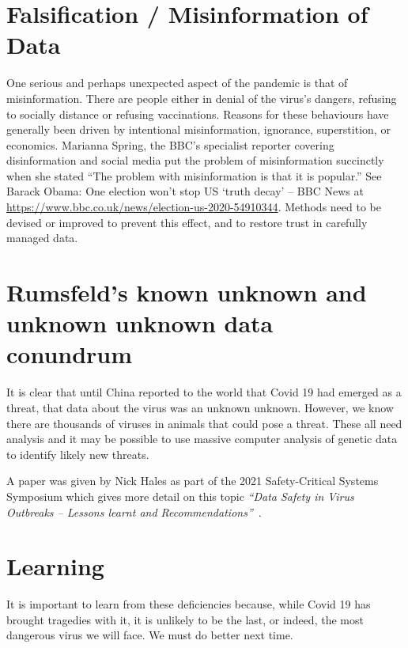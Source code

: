 \section{Falsification / Misinformation of Data}
One serious and perhaps unexpected aspect of the pandemic is that of misinformation. There are people either in denial of the virus’s dangers, refusing to socially distance or refusing vaccinations. Reasons for these behaviours have generally been driven by intentional misinformation, ignorance, superstition, or economics. Marianna Spring, the BBC’s specialist reporter covering disinformation and social media put the problem of misinformation succinctly when she stated “The problem with misinformation is that it is popular.” See Barack Obama: One election won't stop US `truth decay' -- BBC News at \href{https://www.bbc.co.uk/news/election-us-2020-54910344}{https://www.bbc.co.uk/news/election-us-2020-54910344}. Methods need to be devised or improved to prevent this effect, and to restore trust in carefully managed data. 

\section{Rumsfeld’s known unknown and unknown unknown data conundrum}

It is clear that until China reported to the world that Covid 19 had emerged as a threat, that data about the virus was an unknown unknown. However, we know there are thousands of viruses in animals that could pose a threat. These all need analysis and it may be possible to use massive computer analysis of genetic data to identify likely new threats. 
	
A paper was
given by Nick Hales as part of the 2021 Safety-Critical Systems Symposium which gives more detail on this topic {\it“Data Safety in Virus Outbreaks -- Lessons learnt and Recommendations”}~\cite{citation:SCSC161}.

\section{Learning}

It is important to learn from these deficiencies because, while Covid 19 has brought tragedies with it, it is unlikely to be the last, or indeed, the most dangerous virus we will face. We must do better next time.
